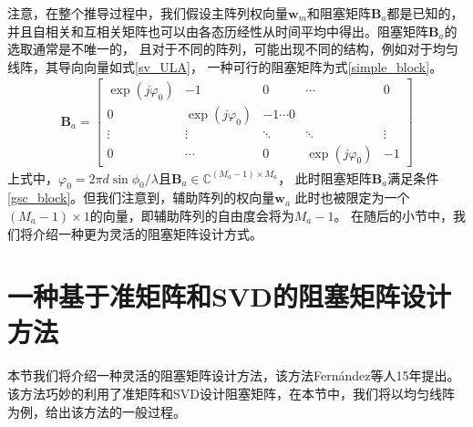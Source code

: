 \documentclass[master]{thesis-uestc}
\begin{document}
注意，在整个推导过程中，我们假设主阵列权向量$\bm{w}_m$和阻塞矩阵$\bm{B}_a$都是已知的，
并且自相关和互相关矩阵也可以由各态历经性从时间平均中得出。阻塞矩阵$\bm{B}_a$的选取通常是不唯一的，
且对于不同的阵列，可能出现不同的结构，例如对于均匀线阵，其导向向量如式\eqref{sv_ULA}，
一种可行的阻塞矩阵为式\eqref{simple_block}。
\begin{equation}\label{simple_block}
    \begin{aligned}
        \bm{B}_a = \begin{bmatrix}
                    \exp(j\varphi_0) & -1 & 0 & \cdots & 0 \\
                    0 & \exp(j\varphi_0) & -1 \cdots 0 \\
                    \vdots & \vdots & \ddots & \ddots & \vdots \\
                    0 & \cdots & 0 & \exp(j\varphi_0) & -1
                   \end{bmatrix}
    \end{aligned}
\end{equation}
上式中，$\varphi_0=2\pi d\sin\phi_0/\lambda$且$\bm{B}_a\in\mathbb{C}^{(M_a-1)\times M_a}$，
此时阻塞矩阵$\bm{B}_a$满足条件\eqref{gsc_block}。但我们注意到，辅助阵列的权向量$\bm{w}_a$
此时也被限定为一个$(M_a-1)\times1$的向量，即辅助阵列的自由度会将为$M_a-1$。
在随后的小节中，我们将介绍一种更为灵活的阻塞矩阵设计方式。

\section{一种基于准矩阵和SVD的阻塞矩阵设计方法}
本节我们将介绍一种灵活的阻塞矩阵设计方法，该方法Fernández等人15年提出\cite{Fernández}。
该方法巧妙的利用了准矩阵和SVD设计阻塞矩阵，在本节中，我们将以均匀线阵为例，给出该方法的一般过程。
\end{document}
